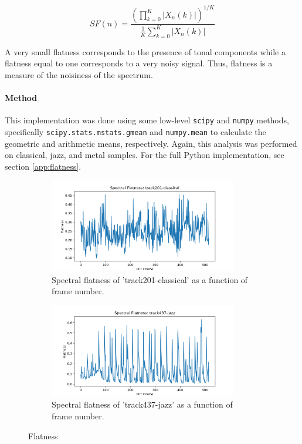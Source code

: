 \documentclass[11pt,a4paper]{article}
\begin{document}
\begin{equation}
SF(n) = \frac{\left( \prod_{k=0}^{K} |X_n(k)|\right)^{1/K}}{\frac{1}{K}\sum_{k=0}^{K} |X_n(k)|}
\end{equation}

A very small flatness corresponds to the presence of tonal components while a flatness equal to one corresponds to a very noisy signal. Thus, flatness is a measure of the noisiness of the spectrum.
\paragraph{Method} This implementation was done using some low-level \verb|scipy| and \verb|numpy| methods, specifically \verb|scipy.stats.mstats.gmean| and \verb|numpy.mean| to calculate the geometric and arithmetic means, respectively. Again, this analysis was performed on classical, jazz, and metal samples. For the full Python implementation, see section \ref{app:flatness}.

\pagebreak

\begin{figure}[tb]
	\centering
	\begin{subfigure}[t]{\hsize}
		\centering
		\includegraphics[width=0.9\textwidth]{flatness_track201-classical}
		\caption{Spectral flatness of 'track201-classical' as a function of frame number.}
		\label{fig:flatness_classical}
	\end{subfigure}
	\begin{subfigure}[t]{\hsize}
		\centering
		\includegraphics[width=0.9\textwidth]{flatness_track437-jazz}
		\caption{Spectral flatness of 'track437-jazz' as a function of frame number.}
		\label{fig:flatness_jazz}
	\end{subfigure}
	\caption{Flatness \label{fig:flatness}}
\end{figure}
\clearpage
\end{document}
